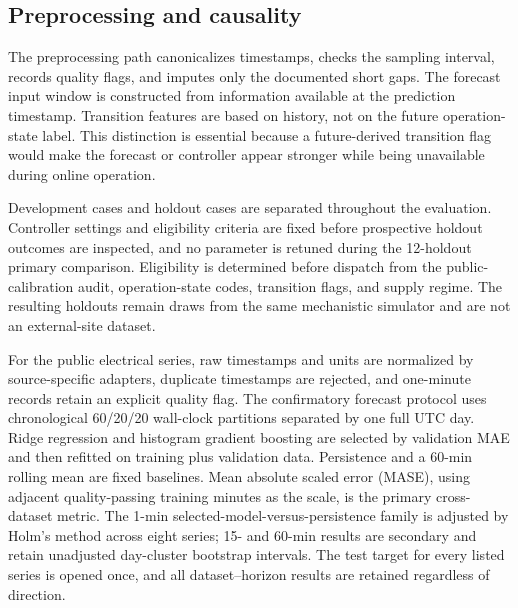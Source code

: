 \subsection{Preprocessing and
causality}\label{preprocessing-and-causality}

The preprocessing path canonicalizes timestamps, checks the sampling
interval, records quality flags, and imputes only the documented short
gaps. The forecast input window is constructed from information
available at the prediction timestamp. Transition features are based on
history, not on the future operation-state label. This distinction is
essential because a future-derived transition flag would make the
forecast or controller appear stronger while being unavailable during
online operation.

Development cases and holdout cases are separated throughout the evaluation.
Controller settings and eligibility criteria are fixed before prospective
holdout outcomes are inspected, and no parameter is retuned during the
12-holdout primary comparison.
Eligibility is determined before dispatch from the public-calibration audit,
operation-state codes, transition flags, and supply regime. The resulting
holdouts remain draws from the same mechanistic simulator and are not an
external-site dataset.

For the public electrical series, raw timestamps and units are normalized by
source-specific adapters, duplicate timestamps are rejected, and one-minute
records retain an explicit quality flag. The confirmatory forecast protocol
uses chronological 60/20/20 wall-clock partitions separated by one full UTC
day. Ridge regression and histogram gradient boosting are selected by
validation MAE and then refitted on training plus validation data. Persistence
and a 60-min rolling mean are fixed baselines. Mean absolute scaled error
(MASE), using adjacent quality-passing training minutes as the scale, is the
primary cross-dataset metric. The 1-min selected-model-versus-persistence
family is adjusted by Holm's method across eight series; 15- and 60-min results
are secondary and retain unadjusted day-cluster bootstrap intervals. The test
target for every listed series is opened once, and all dataset--horizon results
are retained regardless of direction.


